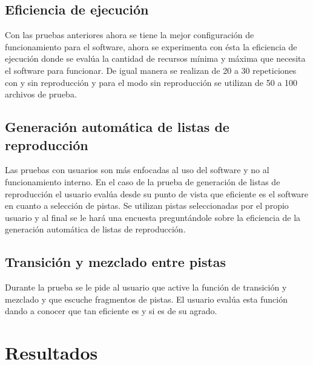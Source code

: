 \subsection{Eficiencia de ejecuci\'on}

Con las pruebas anteriores ahora se tiene la mejor configuraci\'on de funcionamiento para el software, ahora se experimenta con \'esta la eficiencia de ejecuci\'on donde se eval\'ua la cantidad de recursos m\'inima y m\'axima que necesita el software para funcionar. De igual manera se realizan de 20 a 30 repeticiones con y sin reproducci\'on y para el modo sin reproducci\'on se utilizan de 50 a 100 archivos de prueba.

\subsection{Generaci\'on autom\'atica de listas de reproducci\'on}

Las pruebas con usuarios son m\'as enfocadas al uso del software y no al funcionamiento interno. En el caso de la prueba de generaci\'on de listas de reproducci\'on el usuario eval\'ua desde su punto de vista que eficiente es el software en cuanto a selecci\'on de pistas. Se utilizan pistas seleccionadas por el propio usuario y al final se le har\'a una encuesta pregunt\'andole sobre la eficiencia de la generaci\'on autom\'atica de listas de reproducci\'on.

\subsection{Transici\'on y mezclado entre pistas}

Durante la prueba se le pide al usuario que active la funci\'on de transici\'on y mezclado y que escuche fragmentos de pistas. El usuario eval\'ua esta funci\'on dando a conocer que tan eficiente es y si es de su agrado.



\section{Resultados}


